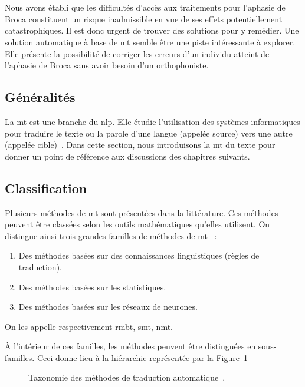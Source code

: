 \section{}

Nous avons établi que les difficultés d'accès aux traitements pour l'aphasie de Broca 
constituent un risque inadmissible en vue de ses effets potentiellement catastrophiques.
Il est donc urgent de trouver des solutions pour y remédier.
Une solution automatique à base de \gls{mt} semble être une piste intéressante à explorer.
Elle présente la possibilité de corriger les erreurs d'un individu atteint de l'aphasie de Broca
sans avoir besoin d'un orthophoniste.

\subsection{Généralités}

La \gls{mt} est une branche du \gls{nlp}.
Elle étudie l'utilisation des systèmes informatiques pour traduire le texte ou la parole 
d'une langue (appelée source) vers une autre (appelée cible)~\cite{routledge}.
Dans cette section, nous introduisons la \gls{mt} du texte 
pour donner un point de référence aux discussions des chapitres suivants.

\subsection{Classification}

Plusieurs méthodes de \gls{mt} sont présentées dans la littérature.
Ces méthodes peuvent être classées selon les outils mathématiques qu'elles utilisent.
On distingue ainsi trois grandes familles de méthodes de \gls{mt}~\cite{deep-nmt-survey} :
\begin{enumerate}
    \item Des méthodes basées sur des connaissances linguistiques (règles de traduction).
    \item Des méthodes basées sur les statistiques.
    \item Des méthodes basées sur les réseaux de neurones.
\end{enumerate}
On les appelle respectivement \gls{rmbt}, \gls{smt}, \gls{nmt}.

À l'intérieur de ces familles, les méthodes peuvent être distinguées en sous-familles.
Ceci donne lieu à la hiérarchie représentée par la Figure~\ref{fig.mt-taxonomy-tree}
\begin{figure}[hbt]
    \centering
    \resizebox{\textwidth}{!}{ }
    \caption[Taxonomie des méthodes de traduction automatique.]
    {Taxonomie des méthodes de traduction automatique~\cite{deep-nmt-survey,hybrid-mt}.}
    \label{fig.mt-taxonomy-tree}
\end{figure}

